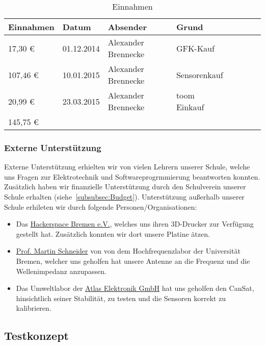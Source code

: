 \begin{table}[htbp]
  \centering
  \caption{Einnahmen}
    \begin{tabular}{p{}p{}p{}p{}rrrl}
    \toprule
    \multicolumn{1}{c}{\textbf{Einnahmen}} & \textbf{Datum} & \textbf{Absender} & \textbf{Grund} \\
    \midrule
              17,30 \euro  & 01.12.2014 & Alexander Brennecke & GFK-Kauf \\
           107,46 \euro  & 10.01.2015 & Alexander Brennecke & Sensorenkauf \\
              20,99 \euro  & 23.03.2015 & Alexander Brennecke & toom Einkauf \\
    \bottomrule
    145,75 \euro & & & \\
    \bottomrule
    \end{tabular}%
  \label{tab:budgeteinnahmen}%
\end{table}%



\subsubsection{Externe Unterstützung}
Externe Unterstützung erhielten wir von vielen Lehrern unserer Schule, welche uns Fragen zur Elektrotechnik und Softwareprogrmmierung beantworten konnten. Zusätzlich haben wir finanzielle Unterstützung durch den Schulverein unserer Schule erhalten (siehe~\ref{subsubsec:Budget}).
Unterstützung außerhalb unserer Schule erhileten wir durch folgende Personen/Organisationen:

\begin{itemize}
	\item Das \href{https://www.hackerspace-bremen.de/}{Hackerspace Bremen e.V.}, welches uns ihren 3D-Drucker zur Verfügung gestellt hat. Zusätzlich konnten wir dort unsere Platine ätzen.
	\item \href{http://de.wikipedia.org/wiki/Martin_Schneider_(Nachrichtentechniker)} {Prof. Martin Schneider} von von dem Hochfrequenzlabor der Universität Bremen, welcher uns geholfen hat unsere Antenne an die Frequenz und die Wellenimpedanz anzupassen.
	\item  Das Umweltlabor der \href{http://www.atlas-elektronik.com/atlas-elektronik/}{Atlas Elektronik GmbH} hat uns geholfen den CanSat, hinsichtlich seiner Stabilität, zu testen und die Sensoren korrekt zu kalibrieren.
\end{itemize}

\subsection{Testkonzept}